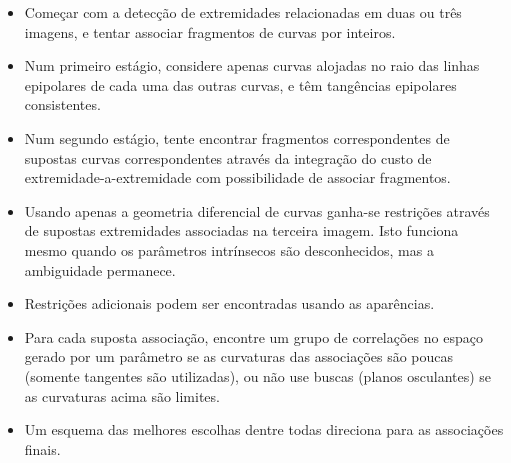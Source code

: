 \begin{itemize}
\item Começar com a detecção de extremidades relacionadas em duas ou três imagens, e tentar associar fragmentos de curvas por inteiros.
\item Num primeiro estágio, considere apenas curvas alojadas no raio das linhas epipolares de cada uma das outras curvas, e têm tangências epipolares consistentes.
\item Num segundo estágio, tente encontrar fragmentos correspondentes de supostas curvas correspondentes através da integração do custo de extremidade-a-extremidade com possibilidade de associar fragmentos.
\item Usando apenas a geometria diferencial de curvas ganha-se restrições através de supostas extremidades associadas na terceira imagem. Isto funciona mesmo quando os parâmetros intrínsecos são desconhecidos, mas a ambiguidade permanece.
\item Restrições adicionais podem ser encontradas usando as aparências.
\item Para cada suposta associação, encontre um grupo de correlações no espaço gerado por um parâmetro se as curvaturas das associações são poucas (somente tangentes são utilizadas), ou não use buscas (planos osculantes) se as curvaturas acima são limites.
\item Um esquema das melhores escolhas dentre todas direciona para as associações finais.
\end{itemize}
